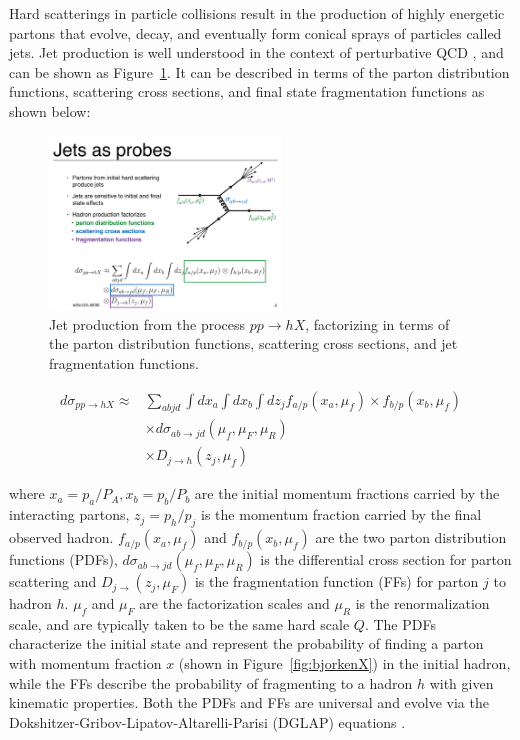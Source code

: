 

Hard scatterings in particle collisions result in the production of highly energetic partons that evolve, decay, and eventually form conical sprays of particles called jets. Jet production is well understood in the context of perturbative QCD \cite{PhysRevLett.39.1436}, and can be shown as Figure~\ref{fig:feynman_jet}. It can be described in terms of the parton distribution functions, scattering cross sections, and final state fragmentation functions as shown below:

\begin{figure}[htbp]
\begin{center}
\includegraphics[width=0.55\textwidth]{figures/theory/feynman_jet}
\caption{Jet production from the process $pp \rightarrow hX$, factorizing in terms of the parton distribution functions, scattering cross sections, and jet fragmentation functions. \cite{Qin:2015srf}}
\label{fig:feynman_jet}
\end{center}
\end{figure}

\begin{align}
d \sigma_{pp \rightarrow hX} \approx & \sum_{abjd} \int dx_a \int dx_b \int dz_j f_{a/p} (x_a, \mu_f) \times f_{b/p} (x_b, \mu_f) \\
& \times d\sigma_{ab\rightarrow jd} (\mu_f, \mu_F, \mu_R) \\
& \times D_{j \rightarrow h} (z_j, \mu_f)
\label{eq:jetCS}
\end{align}

where $x_a = p_a/P_A, x_b = p_b / P_b$ are the initial momentum fractions carried by the interacting partons, $z_j = p_h / p_j$ is the momentum fraction carried by the final observed hadron. $f_{a/p} (x_a, \mu_f)$ and $f_{b/p} (x_b, \mu_f)$ are the two parton distribution functions (PDFs), $d\sigma_{ab\rightarrow jd} (\mu_f, \mu_F, \mu_R)$ is the differential cross section for parton scattering and $D_{j\rightarrow }(z_j,\mu_F)$ is the fragmentation function (FFs) for parton $j$ to hadron $h$. $\mu_f$ and $\mu_F$ are the factorization scales and $\mu_R$ is the renormalization scale, and are typically taken to be the same hard scale $Q$. The PDFs characterize the initial state and represent the probability of finding a parton with momentum fraction $x$ (shown in Figure~\ref{fig:bjorkenX}) in the initial hadron, while the FFs describe the probability of fragmenting to a hadron $h$ with given kinematic properties. Both the PDFs and FFs are universal and evolve via the Dokshitzer-Gribov-Lipatov-Altarelli-Parisi (DGLAP) equations \cite{ALTARELLI1977298, Gribov:1972ri, Dokshitzer:1977sg}. 

